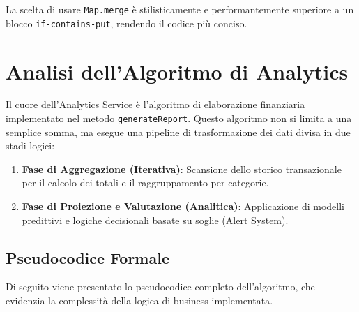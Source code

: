 La scelta di usare \texttt{Map.merge} è stilisticamente e performantemente superiore a un blocco \texttt{if-contains-put}, rendendo il codice più conciso.

\section{Analisi dell'Algoritmo di Analytics}

Il cuore dell'Analytics Service è l'algoritmo di elaborazione finanziaria implementato nel metodo \texttt{generateReport}. Questo algoritmo non si limita a una semplice somma, ma esegue una pipeline di trasformazione dei dati divisa in due stadi logici:
\begin{enumerate}
    \item \textbf{Fase di Aggregazione (Iterativa)}: Scansione dello storico transazionale per il calcolo dei totali e il raggruppamento per categorie.
    \item \textbf{Fase di Proiezione e Valutazione (Analitica)}: Applicazione di modelli predittivi e logiche decisionali basate su soglie (Alert System).
\end{enumerate}

\subsection{Pseudocodice Formale}

Di seguito viene presentato lo pseudocodice completo dell'algoritmo, che evidenzia la complessità della logica di business implementata.

\bigskip

